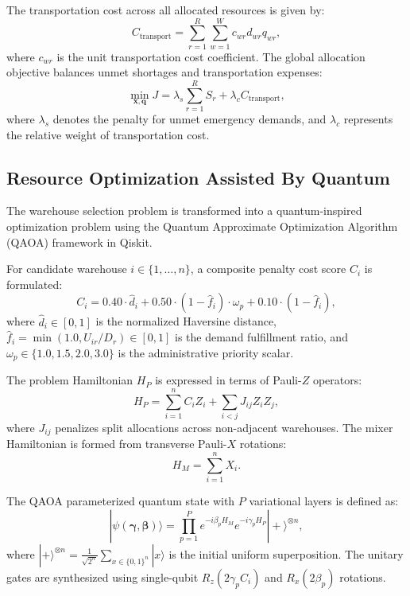 \documentclass[conference]{IEEEtran}
\begin{document}
The transportation cost across all allocated resources is given by:
\begin{equation}
C_{\text{transport}} = \sum_{r=1}^R \sum_{w=1}^W c_{wr} d_{wr} q_{wr},
\label{eq:transport_cost}
\end{equation}
where $c_{wr}$ is the unit transportation cost coefficient. The global allocation objective balances unmet shortages and transportation expenses:
\begin{equation}
\min_{\mathbf{x}, \mathbf{q}} J = \lambda_s \sum_{r=1}^R S_r + \lambda_c C_{\text{transport}},
\label{eq:global_obj}
\end{equation}
where $\lambda_s$ denotes the penalty for unmet emergency demands, and $\lambda_c$ represents the relative weight of transportation cost.

\subsection{Resource Optimization Assisted By Quantum}
The warehouse selection problem is transformed into a quantum-inspired optimization problem using the Quantum Approximate Optimization Algorithm (QAOA) framework in Qiskit.

For candidate warehouse $i \in \{1, \dots, n\}$, a composite penalty cost score $C_i$ is formulated:
\begin{equation}
C_i = 0.40 \cdot \hat{d}_i + 0.50 \cdot (1 - \hat{f}_i) \cdot \omega_p + 0.10 \cdot (1 - \hat{f}_i),
\label{eq:qiskit_cost}
\end{equation}
where $\hat{d}_i \in [0, 1]$ is the normalized Haversine distance, $\hat{f}_i = \min(1.0, U_{ir} / D_r) \in [0, 1]$ is the demand fulfillment ratio, and $\omega_p \in \{1.0, 1.5, 2.0, 3.0\}$ is the administrative priority scalar.

The problem Hamiltonian $H_P$ is expressed in terms of Pauli-$Z$ operators:
\begin{equation}
H_P = \sum_{i=1}^n C_i Z_i + \sum_{i < j} J_{ij} Z_i Z_j,
\label{eq:ising_hp}
\end{equation}
where $J_{ij}$ penalizes split allocations across non-adjacent warehouses. The mixer Hamiltonian is formed from transverse Pauli-$X$ rotations:
\begin{equation}
H_M = \sum_{i=1}^n X_i.
\label{eq:mixer_hm}
\end{equation}

The QAOA parameterized quantum state with $P$ variational layers is defined as:
\begin{equation}
|\psi(\boldsymbol{\gamma}, \boldsymbol{\beta})\rangle = \prod_{p=1}^P e^{-i \beta_p H_M} e^{-i \gamma_p H_P} |+\rangle^{\otimes n},
\label{eq:qaoa_state}
\end{equation}
where $|+\rangle^{\otimes n} = \frac{1}{\sqrt{2^n}}\sum_{x \in \{0,1\}^n} |x\rangle$ is the initial uniform superposition. The unitary gates are synthesized using single-qubit $R_z(2 \gamma_p C_i)$ and $R_x(2 \beta_p)$ rotations.
\end{document}
